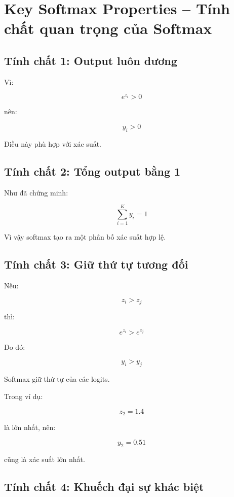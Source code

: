 \section{Key Softmax Properties -- Tính chất quan trọng của Softmax}

\subsection{Tính chất 1: Output luôn dương}

Vì:

\[
    e^{z_i}>0
\]

nên:

\[
    y_i>0
\]

Điều này phù hợp với xác suất.

\subsection{Tính chất 2: Tổng output bằng 1}

Như đã chứng minh:

\[
    \sum_{i=1}^{K}y_i=1
\]

Vì vậy softmax tạo ra một phân bố xác suất hợp lệ.

\subsection{Tính chất 3: Giữ thứ tự tương đối}

Nếu:

\[
    z_i > z_j
\]

thì:

\[
    e^{z_i} > e^{z_j}
\]

Do đó:

\[
    y_i > y_j
\]

Softmax giữ thứ tự của các logits.

\begin{vidu}
Trong ví dụ:

\[
    z_2=1.4
\]

là lớn nhất, nên:

\[
    y_2=0.51
\]

cũng là xác suất lớn nhất.
\end{vidu}

\subsection{Tính chất 4: Khuếch đại sự khác biệt}

